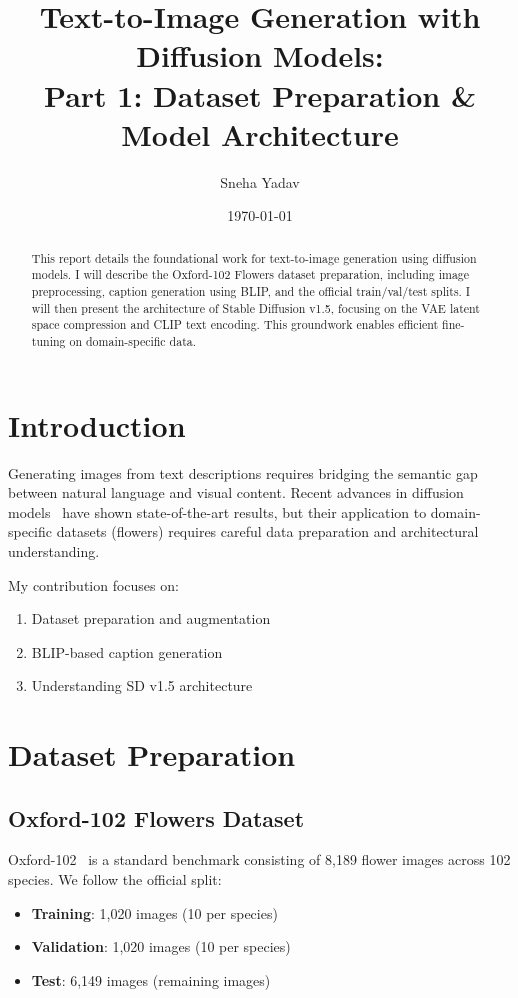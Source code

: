 \documentclass[11pt]{article}
\title{Text-to-Image Generation with Diffusion Models:\\
{\large Part 1: Dataset Preparation \& Model Architecture}}
\author{Sneha Yadav}
\date{\today}
\begin{document}
\maketitle

\begin{abstract}
This report details the foundational work for text-to-image generation using diffusion models. I will describe the Oxford-102 Flowers dataset preparation, including image preprocessing, caption generation using BLIP, and the official train/val/test splits. I will then present the architecture of Stable Diffusion v1.5, focusing on the VAE latent space compression and CLIP text encoding. This groundwork enables efficient fine-tuning on domain-specific data.
\end{abstract}

\section{Introduction}

Generating images from text descriptions requires bridging the semantic gap between natural language and visual content. Recent advances in diffusion models~\cite{ho2020denoising,rombach2021high} have shown state-of-the-art results, but their application to domain-specific datasets (flowers) requires careful data preparation and architectural understanding.

My contribution focuses on:
\begin{enumerate}
    \item Dataset preparation and augmentation
    \item BLIP-based caption generation
    \item Understanding SD v1.5 architecture
\end{enumerate}

\section{Dataset Preparation}

\subsection{Oxford-102 Flowers Dataset}

Oxford-102~\cite{nilsback2008automated} is a standard benchmark consisting of 8,189 flower images across 102 species. We follow the official split:
\begin{itemize}
    \item \textbf{Training}: 1,020 images (10 per species)
    \item \textbf{Validation}: 1,020 images (10 per species)
    \item \textbf{Test}: 6,149 images (remaining images)
\end{itemize}
\end{document}
